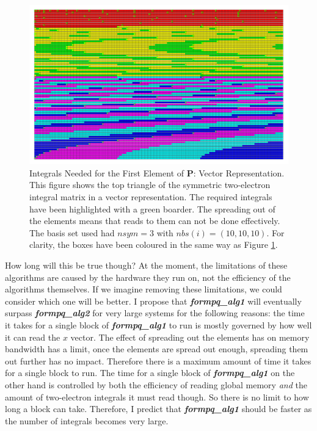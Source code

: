 \documentclass[12pt]{report}
\newcommand{\kernel}[1]{\textit{\textbf{#1}}}
\begin{document}
\begin{figure}
\includegraphics[width=1\textwidth]{Figures/eint2_vec_lots.png}
\caption[Integrals Needed for the First Element of \textbf{P}: Vector Representation]
{Integrals Needed for the First Element of \textbf{P}: Vector Representation. This figure shows the top triangle of the symmetric two-electron integral matrix in a vector representation. The required integrals have been highlighted with a green boarder.  The spreading out of the elements means that reads to them can not be done effectively. The basis set used had $nsym=3$ with $nbs(i) = (10, 10, 10)$. For clarity, the boxes have been coloured in the same way as Figure \ref{fig:eint2matlots}.}
\label{fig:eint2matlots}
\end{figure}


How long will this be true though? At the moment, the limitations of these algorithms are caused by the hardware they run on, not the efficiency of the algorithms themselves. If we imagine removing these limitations, we could consider which one will be better. I propose that \kernel{formpq\_alg1} will eventually surpass \kernel{formpq\_alg2} for very large systems for the following reasons: the time it takes for a single block of \kernel{formpq\_alg1} to run is mostly governed by how well it can read the $x$ vector. The effect of spreading out the elements has on memory bandwidth has a limit, once the elements are spread out enough, spreading them out further has no impact. Therefore there is a maximum amount of time it takes for a single block to run. The time for a single block of \kernel{formpq\_alg1} on the other hand is controlled by both the efficiency of reading global memory \textit{and} the amount of two-electron integrals it must read though. So there is no limit to how long a block can take. Therefore, I predict that \kernel{formpq\_alg1} should be faster as the number of integrals becomes very large.
\end{document}
